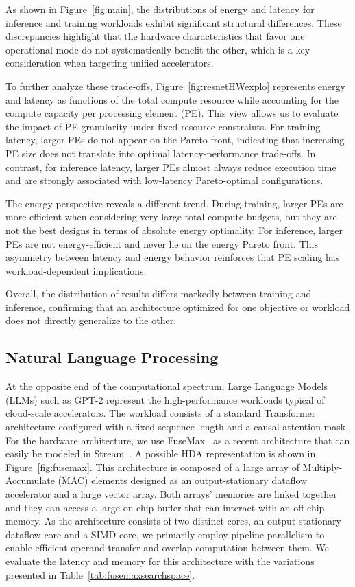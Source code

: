 \documentclass[lettersize,journal]{IEEEtran}
\begin{document}
As shown in Figure~\ref{fig:main}, the distributions of energy and latency for inference and training workloads exhibit significant structural differences. These discrepancies highlight that the hardware characteristics that favor one operational mode do not systematically benefit the other, which is a key consideration when targeting unified accelerators.

To further analyze these trade-offs, Figure~\ref{fig:resnetHWexplo} represents energy and latency as functions of the total compute resource while accounting for the compute capacity per processing element (PE). This view allows us to evaluate the impact of PE granularity under fixed resource constraints. For training latency, larger PEs do not appear on the Pareto front, indicating that increasing PE size does not translate into optimal latency-performance trade-offs. In contrast, for inference latency, larger PEs almost always reduce execution time and are strongly associated with low-latency Pareto-optimal configurations.

The energy perspective reveals a different trend. During training, larger PEs are more efficient when considering very large total compute budgets, but they are not the best designs in terms of absolute energy optimality. For inference, larger PEs are not energy-efficient and never lie on the energy Pareto front. This asymmetry between latency and energy behavior reinforces that PE scaling has workload-dependent implications.

Overall, the distribution of results differs markedly between training and inference, confirming that an architecture optimized for one objective or workload does not directly generalize to the other.

\subsection{Natural Language Processing}
At the opposite end of the computational spectrum, Large Language Models (LLMs) such as GPT-2 represent the high-performance workloads typical of cloud-scale accelerators. The workload consists of a standard Transformer architecture configured with a fixed sequence length and a causal attention mask. For the hardware architecture, we use FuseMax~\cite{fusemax2024} as a recent architecture that can easily be modeled in Stream~\cite{zigzagllm2024}. A possible HDA representation is shown in Figure~\ref{fig:fusemax}. This architecture is composed of a large array of Multiply-Accumulate (MAC) elements designed as an output-stationary dataflow accelerator and a large vector array. Both arrays' memories are linked together and they can access a large on-chip buffer that can interact with an off-chip memory. 
As the architecture consists of two distinct cores, an output-stationary dataflow core and a SIMD core, we primarily employ pipeline parallelism to enable efficient operand transfer and overlap computation between them.
We evaluate the latency and memory for this architecture with the variations presented in Table~\ref{tab:fusemaxsearchspace}. 
\end{document}
